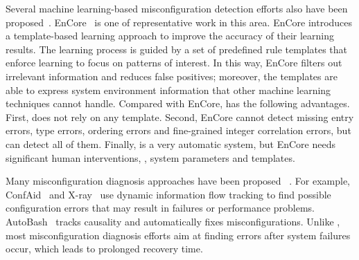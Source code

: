 Several machine learning-based misconfiguration detection efforts 
also have been proposed~\cite{yuan11context, zhang14encore}.
EnCore~\cite{zhang14encore} is one of representative work in this area.
EnCore introduces a template-based
learning approach to improve the accuracy of their learning results.
The learning process is guided by a set of predefined rule templates
that enforce learning to focus on patterns of interest.
In this way, EnCore filters out irrelevant information and reduces
false positives; moreover, the templates are able to express
system environment information that other machine learning
techniques cannot handle.
Compared with EnCore, \app has the following advantages.
First, \app does not rely on any template. 
Second, EnCore cannot detect missing entry errors, type errors,
ordering errors and fine-grained integer correlation errors,
but \app can detect all of them.
Finally, \app is a very automatic system, but
EnCore needs significant human interventions, \eg, system parameters
and templates.

Many misconfiguration diagnosis approaches have been proposed%
~\cite{attariyan10automating, attariyan12x-ray}.
For example, ConfAid~\cite{attariyan10automating} 
and X-ray~\cite{attariyan12x-ray} use dynamic information
flow tracking to find possible configuration errors that may result in
failures or performance problems. AutoBash~\cite{su07autobash} 
tracks causality and automatically fixes 
misconfigurations. Unlike \app, most misconfiguration
diagnosis efforts aim at finding errors after system
failures occur, which leads to prolonged recovery time.



